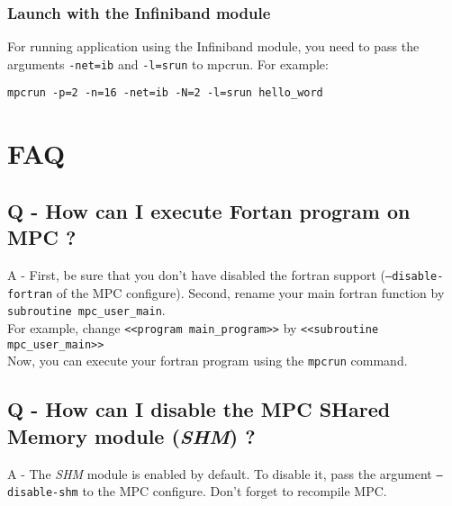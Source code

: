 \documentclass[a4paper,11pt]{article}
\begin{document}
\subsubsection{Launch with the Infiniband module}

For running application using the Infiniband module, you need to pass the arguments \texttt{-net=ib} and \texttt{-l=srun} to mpcrun. For example:
\begin{verbatim}
mpcrun -p=2 -n=16 -net=ib -N=2 -l=srun hello_word
\end{verbatim}

\section{FAQ}
\label{sec:faq}
\subsection*{Q - How can I execute Fortan program on MPC ?}
A - First, be sure that you don't have disabled the fortran support (\texttt{--disable-fortran} of the MPC configure).
Second, rename your main fortran function by {\tt subroutine mpc\_user\_main}.\\
For example, change {\tt{\textless}{\textless}program main\_program{\textgreater}{\textgreater}} by {\tt{\textless}{\textless}subroutine mpc\_user\_main{\textgreater}{\textgreater}}\\
Now, you can execute your fortran program using the \texttt{mpcrun} command.

\subsection*{Q - How can I disable the MPC SHared Memory module (\emph{SHM}) ?}
A - The \emph{SHM} module is enabled by default. To disable it, pass the argument {\tt--disable-shm} to the MPC configure. Don't forget to recompile MPC.
\end{document}
